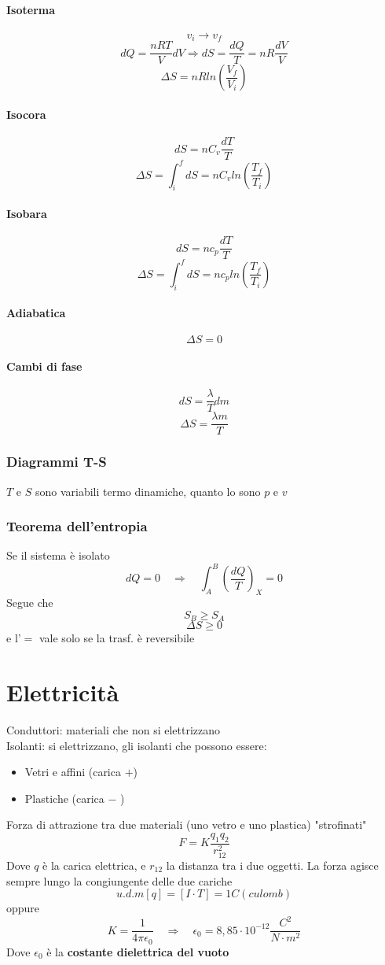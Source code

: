 \documentclass[a4paper]{report}
\begin{document}
  \subsubsection{Isoterma}
  \[ v_i \rightarrow v_f\]
  \[ dQ = \frac{nRT}{V} dV \Rightarrow dS = \frac{dQ}{T} = nR\frac{dV}{V} \]
  \[ \Delta S = nR ln(\frac{V_f}{V_i}) \]

  \subsubsection{Isocora}
  \[ dS = nC_v\frac{dT}{T} \]
  \[ \Delta S = \int_i^f dS = nC_v ln(\frac{T_f}{T_i}) \]

  \subsubsection{Isobara}
  \[ dS = nc_p\frac{dT}{T} \]
  \[ \Delta S = \int_i^f dS = n c_p ln(\frac{T_f}{T_i})\]

  \subsubsection{Adiabatica}
  \[ \Delta S = 0 \]

  \subsubsection{Cambi di fase}
  \[ dS = \frac{\lambda}{T} dm\]
  \[ \Delta S = \frac{\lambda m}{T} \]

  \subsection{Diagrammi T-S}
  $T$ e $S$ sono variabili termo dinamiche, quanto lo sono $p$ e $v$
  \subsection{Teorema dell'entropia}
  Se il sistema è isolato
  \[ dQ = 0 \quad \Rightarrow \quad \int_A^B(\frac{dQ}{T})_X = 0\]
  Segue che
  \[ S_B \geq S_A \]
  \[ \Delta S \geq 0 \]
  e l'$=$ vale solo se la trasf. è reversibile

  \chapter{Elettricità}
  Conduttori: materiali che non si elettrizzano \\
  Isolanti: si elettrizzano, gli isolanti che possono essere:
  \begin{itemize}
    \item Vetri e affini (carica $+$)
    \item Plastiche (carica $-$ )
  \end{itemize}
  Forza di attrazione tra due materiali (uno vetro e uno plastica) "strofinati"
  \[ F = K\frac{q_1 q_2}{r_{12}^2} \]
  Dove $q$ è la carica elettrica, e $r_{12}$ la distanza tra i due oggetti. La forza agisce sempre lungo la congiungente delle due cariche
  \[u.d.m[q] = [I\cdot T] = 1C (culomb)\]
  oppure
  \[ K = \frac{1}{4 \pi \epsilon_0} \quad \Rightarrow \quad \epsilon_0 = 8,85\cdot 10^{-12} \frac{C^2}{N\cdot m^2}\]
  Dove $\epsilon_0$ è la \textbf{costante dielettrica del vuoto}\\
\end{document}
